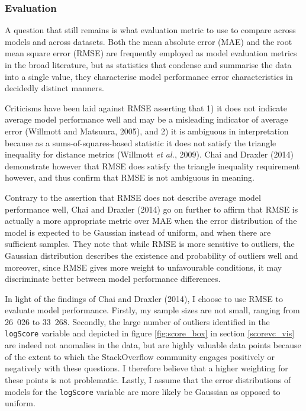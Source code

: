 \documentclass[11pt,preprint, authoryear]{article}
\begin{document}
\subsubsection{\texorpdfstring{Evaluation
\label{eval}}{Evaluation }}\label{evaluation}

A question that still remains is what evaluation metric to use to
compare across models and across datasets. Both the mean absolute error
(MAE) and the root mean square error (RMSE) are frequently employed as
model evaluation metrics in the broad literature, but as statistics that
condense and summarise the data into a single value, they characterise
model performance error characteristics in decidedly distinct manners.

Criticisms have been laid against RMSE asserting that 1) it does not
indicate average model performance well and may be a misleading
indicator of average error (Willmott and Matsuura, 2005), and 2) it is
ambiguous in interpretation because as a sums-of-squares-based statistic
it does not satisfy the triangle inequality for distance metrics
(Willmott \emph{et al.}, 2009). Chai and Draxler (2014) demonstrate
however that RMSE does satisfy the triangle inequality requirement
however, and thus confirm that RMSE is not ambiguous in meaning.

Contrary to the assertion that RMSE does not describe average model
performance well, Chai and Draxler (2014) go on further to affirm that
RMSE is actually a more appropriate metric over MAE when the error
distribution of the model is expected to be Gaussian instead of uniform,
and when there are sufficient samples. They note that while RMSE is more
sensitive to outliers, the Gaussian distribution describes the existence
and probability of outliers well and moreover, since RMSE gives more
weight to unfavourable conditions, it may discriminate better between
model performance differences.

In light of the findings of Chai and Draxler (2014), I choose to use
RMSE to evaluate model performance. Firstly, my sample sizes are not
small, ranging from 26~026 to 33~268. Secondly, the large number of
outliers identified in the \texttt{logScore} variable and depicted in
figure \ref{fig:score_box} in section \ref{scorevc_vis} are indeed not
anomalies in the data, but are highly valuable data points because of
the extent to which the StackOverflow community engages positively or
negatively with these questions. I therefore believe that a higher
weighting for these points is not problematic. Lastly, I assume that the
error distributions of models for the \texttt{logScore} variable are
more likely be Gaussian as opposed to uniform.
\end{document}
